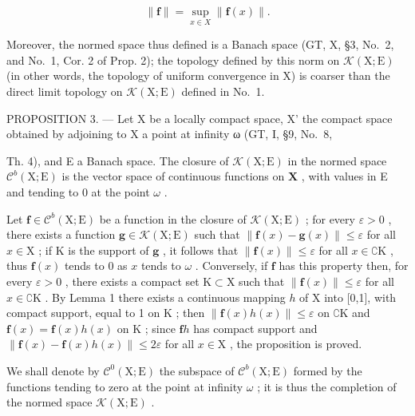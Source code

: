 \[
\| \mathbf {f} \| = \sup _ {x \in X} \| \mathbf {f} (x) \|.\tag{3}
\]

Moreover, the normed space thus defined is a Banach space (GT, X, §3, No.~2, and No.~1, Cor. 2 of Prop. 2); the topology defined by this norm on \(\mathcal{K}(\mathrm{X};\mathrm{E})\) (in other words, the topology of uniform convergence in X) is coarser than the direct limit topology on \(\mathcal{K}(\mathrm{X};\mathrm{E})\) defined in No.~1.

PROPOSITION 3. --- Let X be a locally compact space, X' the compact space obtained by adjoining to X a point at infinity ω (GT, I, §9, No.~8,

Th. 4), and E a Banach space. The closure of \(\mathcal{K}(\mathrm{X};\mathrm{E})\) in the normed space \(\mathcal{C}^b (\mathrm{X};\mathrm{E})\) is the vector space of continuous functions on \(\mathbf{X}\) , with values in E and tending to 0 at the point \(\omega\) .

Let \(\mathbf{f} \in \mathcal{C}^b(\mathrm{X};\mathrm{E})\) be a function in the closure of \(\mathcal{K}(\mathrm{X};\mathrm{E})\) ; for every \(\varepsilon > 0\) , there exists a function \(\mathbf{g} \in \mathcal{K}(\mathrm{X};\mathrm{E})\) such that \(\| \mathbf{f}(x) - \mathbf{g}(x) \| \leqslant \varepsilon\) for all \(x \in \mathrm{X}\) ; if \(\mathrm{K}\) is the support of \(\mathbf{g}\) , it follows that \(\| \mathbf{f}(x) \| \leqslant \varepsilon\) for all \(x \in \complement \mathrm{K}\) , thus \(\mathbf{f}(x)\) tends to 0 as \(x\) tends to \(\omega\) . Conversely, if \(\mathbf{f}\) has this property then, for every \(\varepsilon > 0\) , there exists a compact set \(\mathrm{K} \subset \mathrm{X}\) such that \(\| \mathbf{f}(x) \| \leqslant \varepsilon\) for all \(x \in \complement \mathrm{K}\) . By Lemma 1 there exists a continuous mapping \(h\) of X into {[}0,1{]}, with compact support, equal to 1 on \(\mathrm{K}\) ; then \(\| \mathbf{f}(x) h(x) \| \leqslant \varepsilon\) on \(\complement \mathrm{K}\) and \(\mathbf{f}(x) = \mathbf{f}(x) h(x)\) on \(\mathrm{K}\) ; since \(\mathbf{f}h\) has compact support and \(\| \mathbf{f}(x) - \mathbf{f}(x) h(x) \| \leqslant 2\varepsilon\) for all \(x \in \mathrm{X}\) , the proposition is proved.

We shall denote by \(\mathcal{C}^{0}(\mathrm{X};\mathrm{E})\) the subspace of \(\mathcal{C}^{b}(\mathrm{X};\mathrm{E})\) formed by the functions tending to zero at the point at infinity \(\omega\) ; it is thus the completion of the normed space \(\mathcal{K}(\mathrm{X};\mathrm{E})\) .

